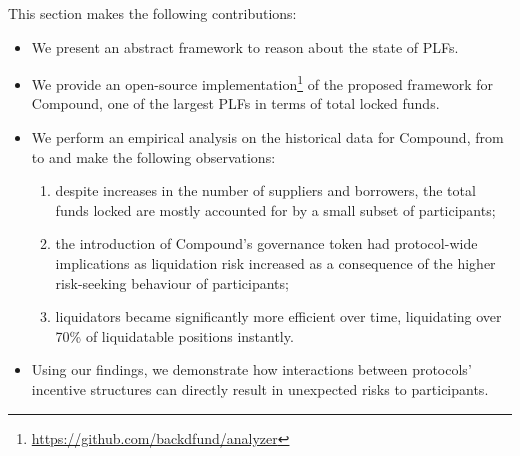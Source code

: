  This section makes the following contributions:
\begin{itemize}
	\item We present an abstract framework to reason about the state of PLFs.

	\item We provide an open-source implementation\footnote{\url{https://github.com/backdfund/analyzer}} of the proposed framework for Compound, one of the largest PLFs in terms of total locked funds.

	\item We perform an empirical analysis on the historical data for Compound, from \StartDate to \EndDate and make the following observations:
	      \begin{enumerate}%
		      \item despite increases in the number of suppliers and borrowers, the total funds locked are mostly accounted for by a small subset of participants;
		      \item the introduction of Compound's governance token had protocol-wide implications as liquidation risk increased as a consequence of the higher risk-seeking behaviour of participants;
		      \item liquidators became significantly more efficient over time, liquidating over 70\% of liquidatable positions instantly.
	      \end{enumerate}

	\item Using our findings, we demonstrate how interactions between protocols' incentive structures can directly result in unexpected risks to participants.
\end{itemize}

